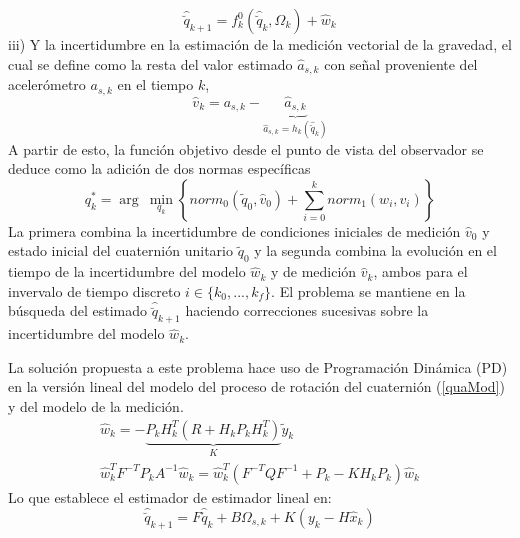 \documentclass[conference]{IEEEtran}
\begin{document}
\begin{equation}
\label{quaMod}
\hat{\breve{q}}_{k+1}=f^0_k(\hat{\breve{q}}_k,\Omega_k)+\hat{w}_k
\end{equation}
 iii) Y la incertidumbre en la estimación de la medición vectorial de la gravedad, el cual se define como la resta del valor estimado $\hat{a}_{s,k}$ con señal proveniente del acelerómetro $a_{s,k}$ en el tiempo $k$,
\begin{equation}
\hat{v}_k=a_{s,k}-\underbrace{\hat{a}_{s,k}}_{\hat{a}_{s,k}=h_k(\hat{\breve{q}}_k)}
\end{equation}
A partir de esto, la función objetivo desde el punto de vista del observador se deduce como la adición de dos normas específicas
\begin{equation}
q^*_k=\arg~\min_{q_k}\left\{norm_0(\tilde{q}_0,\hat{v}_0)+\sum^k_{i=0}norm_1(w_i,v_i)\right\}
\end{equation}
La primera combina la incertidumbre de condiciones iniciales de medición $\hat{v}_0$ y estado inicial del cuaternión unitario $\tilde{q}_0$ y la segunda combina la evolución en el tiempo de la incertidumbre del modelo $\hat{w}_k$ y de medición $\hat{v}_k$, ambos para el invervalo de  tiempo discreto $i\in\{k_0,...,k_f\}$. El problema se mantiene en la búsqueda del estimado $\hat{\breve{q}}_{k+1}$ haciendo correcciones sucesivas sobre la incertidumbre del modelo $\hat{w}_k$.\par
La solución propuesta a este problema hace uso de Programación Dinámica (PD) \cite{Lewis2012} en la versión lineal del modelo del proceso de rotación del cuaternión (\ref{quaMod}) y del modelo de la medición.
\begin{gather}
\hat{w}_{k}=-\underbrace{P_kH_k^T(R+H_kP_kH_k^T)}_K\tilde{y}_k\\
\hat{w}_k^TF^{-T}P_kA^{-1}\hat{w}_k=\hat{w}_k^T(F^{-T}QF^{-1}+P_k-KH_kP_k)\hat{w}_k
\end{gather}
Lo que establece el estimador de estimador lineal en:
\begin{equation}\label{chap2:ObservadorLineal}
\hat{\breve{q}}_{k+1}=F\hat{\breve{q}}_k+B\Omega_{s,k}+K(y_k-H\hat{x}_k)
\end{equation}
\end{document}
